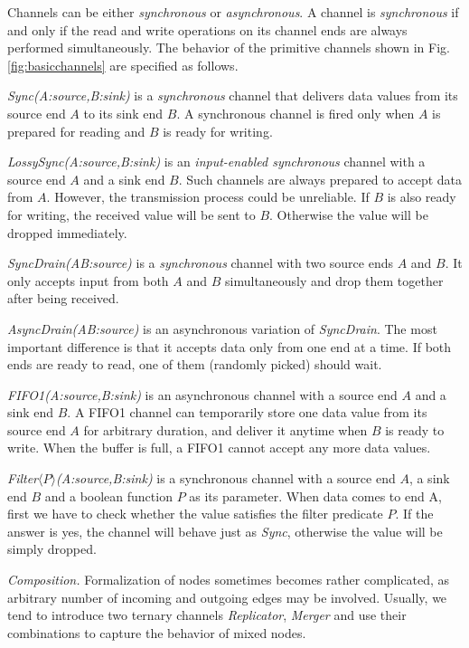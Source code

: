 Channels can be either \emph{synchronous} or \emph{asynchronous}. A channel is \emph{synchronous} if and only if the read and write operations on its channel ends are always performed simultaneously. The behavior of the primitive channels shown in Fig.\ref{fig:basicchannels} are specified as follows.

\begin{description}
    \item \emph{Sync(A:source,B:sink)} is a \emph{synchronous} channel that delivers data values from its source end $A$ to its sink end $B$. A synchronous channel is fired only when $A$ is prepared for reading and $B$ is ready for writing. 
    \item \emph{LossySync(A:source,B:sink)}
    is an \emph{input-enabled synchronous} channel with a source end $A$ and a sink end $B$. Such channels are always prepared to accept data from $A$. However, the transmission process could be unreliable. If $B$ is also ready for writing, the received value will be sent to $B$. Otherwise the value will be dropped immediately.
    \item \emph{SyncDrain(A\:B:source)} is a \emph{synchronous} channel with two source ends $A$ and $B$. It only accepts input from both $A$ and $B$ simultaneously and drop them together after being received.
    \item \emph{AsyncDrain(A\:B:source)} is an asynchronous variation of \emph{SyncDrain}. The most important difference is that it accepts data only from one end at a time. If both ends are ready to read, one of them (randomly picked) should wait.
    \item \emph{FIFO1(A:source,B:sink)} is an asynchronous channel with a source end $A$ and a sink end $B$. A FIFO1 channel can temporarily store one data value from its source end $A$ for arbitrary duration, and deliver it anytime when $B$ is ready to write. When the buffer is full, a FIFO1 cannot accept any more data values.
    \item \emph{Filter$\langle P\rangle$(A:source,B:sink)}
    is a synchronous channel with a source end $A$, a sink end $B$ and a boolean function $P$ as its parameter. When data comes to end A, first we have to check whether the value satisfies the filter predicate $P$. If the answer is yes, the channel will behave just as \emph{Sync}, otherwise the value will be simply dropped.
\end{description}

\noindent\emph{Composition.} Formalization of nodes sometimes becomes rather complicated, as arbitrary number of incoming and outgoing edges may be involved. Usually, we tend to introduce two ternary channels \emph{Replicator}, \emph{Merger} and use their combinations to capture the behavior of mixed nodes.

